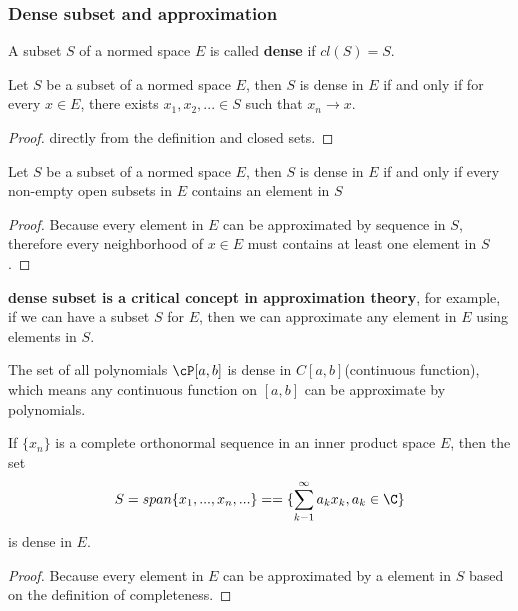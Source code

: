 \begin{refsection}
\subsubsection{Dense subset and approximation}\label{ch:functional-analysis:sec:denseSubsetAndApproximation}

\begin{definition}
A subset $S$ of a normed space $E$ is called \textbf{dense} if $cl(S) = S$.
\end{definition}

\begin{theorem}
\cite[15]{debnath2005hilbert}Let $S$ be a subset of a normed space $E$, then $S$ is dense in $E$ if and only if for every $x\in E$, there exists $x_1,x_2,...\in S$ such that $x_n\to x$. 
\end{theorem}
\begin{proof}
directly from the definition and closed sets.
\end{proof}

\begin{theorem}
\cite[15]{debnath2005hilbert}Let $S$ be a subset of a normed space $E$, then $S$ is dense in $E$ if and only if every non-empty open subsets in $E$ contains an element in $S$ 
\end{theorem}
\begin{proof}
Because every element in $E$ can be approximated by sequence in $S$, therefore every neighborhood of $x\in E$ must contains at least one element in $S$.
\end{proof}

\begin{remark}
\textbf{dense subset is a critical concept in approximation theory}, for example, if we can have a subset $S$ for $E$, then we can approximate any element in $E$ using elements in $S$.
\end{remark}

\begin{example}
The set of all polynomials $\cP[a,b]$ is dense in $C[a,b]$(continuous function), which means any continuous function on $[a,b]$ can be approximate by polynomials.
\end{example}

\begin{theorem}
\cite[110]{debnath2005hilbert} If $\{x_n\}$ is a complete orthonormal sequence in an inner product space $E$, then the set
$$S=span\{x_1,...,x_n,...\} = =\{\sum_{k-1}^\infty a_k x_k,a_k \in \C\}$$
is dense in $E$.
\end{theorem}
\begin{proof}
Because every element in $E$ can be approximated by a element in $S$ based on the definition of completeness.
\end{proof}







\end{refsection}
